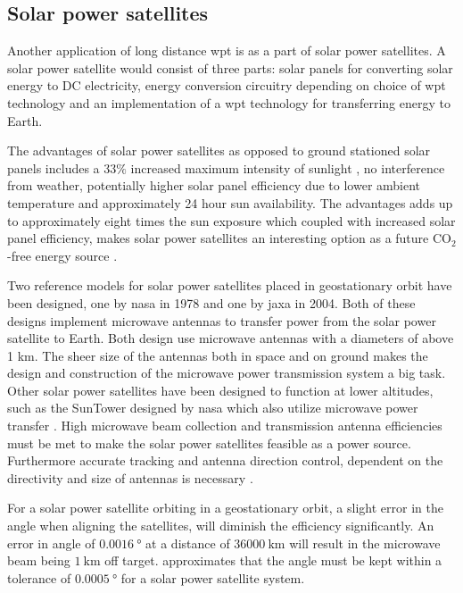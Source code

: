 \subsection{Solar power satellites}\label{sec:solarPowerSatellites}
Another application of long distance \gls{wpt} is as a part of solar power satellites. A solar power satellite would consist of three parts: solar panels for converting solar energy to DC electricity, energy conversion circuitry depending on choice of \gls{wpt} technology and an implementation of a \gls{wpt} technology for transferring energy to Earth.

The advantages of solar power satellites as opposed to ground stationed solar panels includes a $33\%$ increased maximum intensity of sunlight \citep{website:Light_intensity_at_different_lattitudes}, no interference from weather, potentially higher solar panel efficiency due to lower ambient temperature and approximately 24 hour sun availability. The advantages adds up to approximately eight times the sun exposure which coupled with increased solar panel efficiency, makes solar power satellites an interesting option as a future CO$_2$-free energy source \citep{book:shinohara}.

Two reference models for solar power satellites placed in geostationary orbit have been designed, one by \gls{nasa} in 1978 and one by \gls{jaxa} in 2004. Both of these designs implement microwave antennas to transfer power from the solar power satellite to Earth. Both design use microwave antennas with a diameters of above 1 km. The sheer size of the antennas both in space and on ground makes the design and construction of the microwave power transmission system a big task. Other solar power satellites have been designed to function at lower altitudes, such as the SunTower designed by \gls{nasa} which also utilize microwave power transfer \citep{sci_article:suntower}. High microwave beam collection and transmission antenna efficiencies must be met to make the solar power satellites feasible as a power source. Furthermore accurate tracking and antenna direction control, dependent on the directivity and size of antennas is necessary \citep{book:shinohara}.

For a solar power satellite orbiting in a geostationary orbit, a slight error in the angle when aligning the satellites, will diminish the efficiency significantly. 
An error in angle of $\SI{0,0016}{\degree}$ at a distance of $\SI{36000}{\kilo\metre}$ will result 
in the microwave beam being $\SI{1}{\kilo\metre}$ off target. 
\cite{book:shinohara} approximates that the angle must be kept within a tolerance of $\SI{0,0005}{\degree}$ for a solar power satellite system.